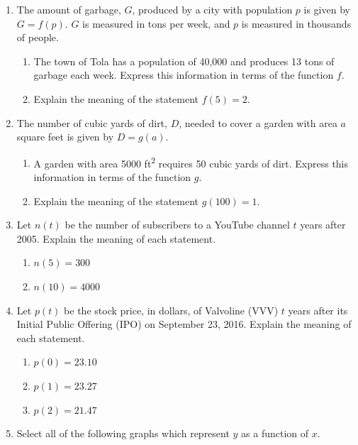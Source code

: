 \begin{enumerate}
\item The amount of garbage, $G$, produced by a city with population
  $p$ is given by $G=f(p)$. $G$ is measured in tons per week, and
  $p$ is measured in thousands of people.

  \begin{enumerate}
  \item The town of Tola has a population of 40,000 and produces 13 tons of
    garbage each week. Express this information in terms of the function
    $f$.
  \item Explain the meaning of the statement $f(5)=2$.
  \end{enumerate}

\item The number of cubic yards of dirt, $D$, needed to cover a garden
  with area $a$ square feet is given by $D=g(a)$.

  \begin{enumerate}
  \item A garden with area 5000 ft\textsuperscript{2} requires 50 cubic
    yards of dirt. Express this information in terms of the function
    $g$.
  \item Explain the meaning of the statement $g(100)=1$.
  \end{enumerate}

\item Let $n(t)$ be the number of subscribers to a YouTube channel $t$ years after 2005.
  Explain the meaning of each statement.
  \begin{enumerate}
    \item $n(5) = 300$
    \item $n(10) = 4000$
\end{enumerate}

\item
  Let $p(t)$ be the stock price, in dollars, of Valvoline (VVV) $t$ years after its Initial Public Offering (IPO) on September 23, 2016. Explain the meaning of each statement.
  \begin{enumerate}
    \item $p(0) = 23.10$
    \item $p(1) = 23.27$
    \item $p(2) = 21.47$
\end{enumerate}

\item  Select all of the following graphs which represent $y$ as a function of $x$.


\end{enumerate}
